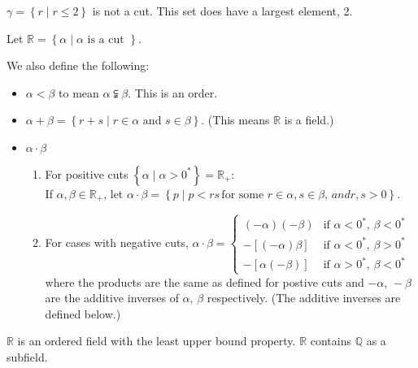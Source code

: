 \documentclass[../main.tex]{subfiles}
\begin{document}
\begin{example}[]
    \( \gamma = \left\{ r \mid r \leq 2 \right\} \) is not a cut.
    This set does have a largest element, 2.
\end{example}

\begin{definition}
    Let \( \mathbb{R} = \left\{ \alpha \mid \alpha \text{ is a cut } \right\}\).
\end{definition}

We also define the following:
\begin{itemize}
    \item \( \alpha < \beta \) to mean \( \alpha \subsetneqq \beta \). This is an order.
    \item \( \alpha + \beta = \left\{ r + s \mid r \in \alpha \text{ and } s \in \beta \right\} \). (This means \( \mathbb{R} \) is a field.)
    \item \( \alpha \cdot \beta \)
    \begin{enumerate}
        \item For positive cuts \( \left\{ \alpha \mid \alpha > 0^* \right\} = \mathbb{R}_+ \): \\
            If \( \alpha, \beta \in \mathbb{R}_+ \), let \( \alpha \cdot \beta = \left\{ p \mid p < rs \, \text{for some } r \in \alpha, s \in \beta, \, and  r,s>0\right\} \).
        \item For cases with negative cuts, \( \alpha \cdot \beta =
        \begin{cases}
            (-\alpha)(-\beta) & \text{if } \alpha < 0^*, \, \beta < 0^* \\
            -[(-\alpha)\beta] & \text{if } \alpha < 0^*, \, \beta > 0^* \\
            -[\alpha(-\beta)] & \text{if } \alpha > 0^*, \, \beta < 0^*
        \end{cases} \) \\
        where the products are the same as defined for postive cuts and \( -\alpha, \, -\beta \) are the additive inverses of \( \alpha, \, \beta \) respectively.
        (The additive inverses are defined below.)
    \end{enumerate}
\end{itemize}

\begin{theorem}[]
    \label{thm_R}
    \( \mathbb{R} \) is an ordered field with the least upper bound property.
    \( \mathbb{R} \) contains \( \mathbb{Q} \) as a subfield.
\end{theorem}
\end{document}
